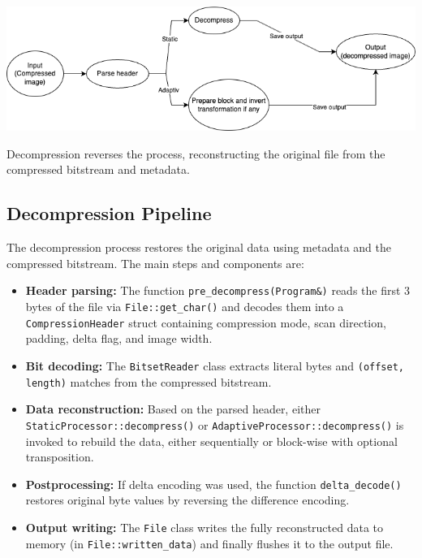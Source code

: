 \documentclass[a4paper,12pt]{article}
\begin{document}
    \includegraphics[width=1\textwidth]{template-fig/decompressor}\par\vspace{1cm}

    Decompression reverses the process, reconstructing the original file from the compressed bitstream and metadata.

    \subsection*{Decompression Pipeline}

    The decompression process restores the original data using metadata and the compressed bitstream. The main steps and components are:

    \begin{itemize}
        \item \textbf{Header parsing:} The function \texttt{pre\_decompress(Program\&)} reads the first 3 bytes of the file via \texttt{File::get\_char()} and decodes them into a \texttt{CompressionHeader} struct containing compression mode, scan direction, padding, delta flag, and image width.

        \item \textbf{Bit decoding:} The \texttt{BitsetReader} class extracts literal bytes and \texttt{(offset, length)} matches from the compressed bitstream.

        \item \textbf{Data reconstruction:} Based on the parsed header, either \texttt{StaticProcessor::decompress()} or \texttt{AdaptiveProcessor::decompress()} is invoked to rebuild the data, either sequentially or block-wise with optional transposition.

        \item \textbf{Postprocessing:} If delta encoding was used, the function \texttt{delta\_decode()} restores original byte values by reversing the difference encoding.

        \item \textbf{Output writing:} The \texttt{File} class writes the fully reconstructed data to memory (in \texttt{File::written\_data}) and finally flushes it to the output file.
    \end{itemize}
\end{document}
